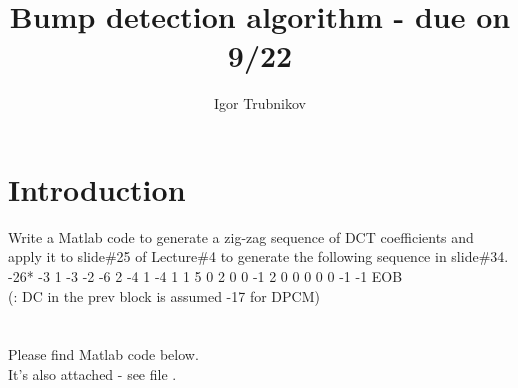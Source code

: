 \documentclass[14pt, letterpaper]{article}
\title{Bump detection algorithm - due on 9/22}
\author{Igor Trubnikov}
\begin{document}
\maketitle
\tableofcontents
\newpage

\section{Introduction}
Write a Matlab code to generate a zig-zag sequence of DCT coefficients and apply it to slide\#25
of Lecture\#4 to generate the following sequence in slide\#34.\\
-26* -3 1 -3 -2 -6 2 -4 1 -4 1 1 5 0 2 0 0 -1 2 0 0 0 0 0 -1 -1 EOB\\
(: DC in the prev block is assumed -17 for DPCM)\\\\
\\Please find Matlab code below.\\
It's also attached - see file .
%

\newpage
\end{document}
